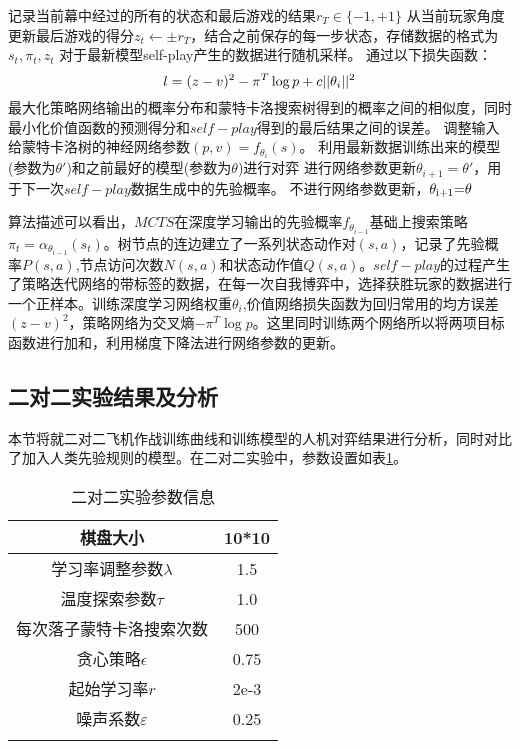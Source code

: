 		\begin{algorithm}[htbp]
		\begin{algorithmic}[1]
		\State 记录当前幕中经过的所有的状态和最后游戏的结果${r_T} \in \{  - 1, + 1\} $
		\State 从当前玩家角度更新最后游戏的得分${z_t} \leftarrow  \pm {r_T}$，结合之前保存的每一步状态，存储数据的格式为$s_t,\pi_t,z_t$
		\EndFor
		\State 对于最新模型self-play产生的数据进行随机采样。
		\State 通过以下损失函数：
		\begin{equation}
		l = {(z - v)^2} - {\pi ^T}\log p + c||{\theta _i}{\rm{|}}{{\rm{|}}^{\rm{2}}}
		\end{equation}
		最大化策略网络输出的概率分布和蒙特卡洛搜索树得到的概率之间的相似度，同时最小化价值函数的预测得分和$self-play$得到的最后结果之间的误差。
		调整输入给蒙特卡洛树的神经网络参数$(p,v) = {f_{{\theta _i}}}(s)$。
		\State 利用最新数据训练出来的模型(参数为$\theta '$)和之前最好的模型(参数为$\theta$)进行对弈
		 \State 进行网络参数更新${\theta _{i + 1}} = \theta '$，用于下一次$self-play$数据生成中的先验概率。
		\Else
		 \State 不进行网络参数更新，${\theta _{{\rm{i + 1}}}}{\rm{ = }}\theta $
		\EndIf
		\EndIf
		\EndFor
	\end{algorithmic}
\end{algorithm}

算法描述可以看出，$MCTS$在深度学习输出的先验概率${f_{{\theta _{i - 1}}}}$基础上搜索策略${\pi _t} = {\alpha _{{\theta _{i - 1}}}}({s_t})$。树节点的连边建立了一系列状态动作对$(s,a)$，记录了先验概率$P(s,a)$,节点访问次数$N(s,a)$和状态动作值$Q(s,a)$。$self-play$的过程产生了策略迭代网络的带标签的数据，在每一次自我博弈中，选择获胜玩家的数据进行一个正样本。训练深度学习网络权重${\theta _i}$,价值网络损失函数为回归常用的均方误差${(z - v)^2}$，策略网络为交叉熵$ - {\pi ^T}\log p$。这里同时训练两个网络所以将两项目标函数进行加和，利用梯度下降法进行网络参数的更新。

\subsection{二对二实验结果及分析}
本节将就二对二飞机作战训练曲线和训练模型的人机对弈结果进行分析，同时对比了加入人类先验规则的模型。在二对二实验中，参数设置如表\ref{erduiercanshu}。
\begin{table}[htbp]
	\centering
	\caption{二对二实验参数信息}
	\begin{tabular}{c|c}
		\hline 
		棋盘大小 & 10*10 \\ 
		\hline 
		学习率调整参数$\lambda$ & 1.5 \\ 
		\hline 
		温度探索参数$\tau$& 1.0 \\ 
		\hline 
		每次落子蒙特卡洛搜索次数 & 500 \\ 
		\hline 
		贪心策略$\epsilon$ & 0.75 \\ 
		\hline 
		起始学习率$r$ & 2e-3\\
		\hline 
		噪声系数$\varepsilon$ &0.25\\
		\hline
		\label{erduiercanshu}
	\end{tabular} 
\end{table}

